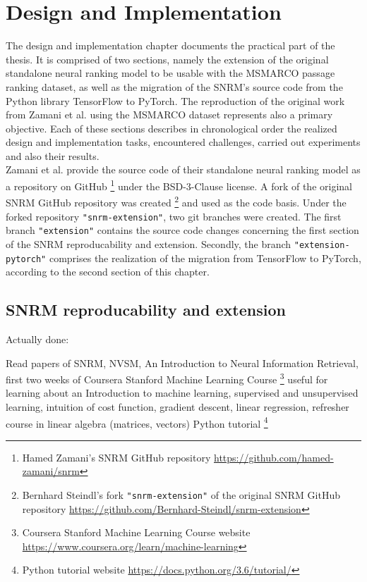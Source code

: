 \chapter{Design and Implementation}

The design and implementation chapter documents the practical part of the thesis.
It is comprised of two sections, namely the extension of the original standalone neural
    ranking model to be usable with the MSMARCO passage ranking dataset,
    as well as the migration of the SNRM's source code from the Python library TensorFlow 
    to PyTorch.
The reproduction of the original work from 
    Zamani et al. \cite{zamani:2018:from-neural-reranking-to-neural-ranking}
    using the MSMARCO dataset represents also a primary objective.
Each of these sections describes in chronological order the realized
    design and implementation tasks, encountered challenges, 
    carried out experiments and also their results.\\
Zamani et al. provide the source code of their standalone neural ranking model as a
    repository on GitHub
    \footnote{Hamed Zamani's SNRM GitHub repository \url{https://github.com/hamed-zamani/snrm}}
    under the BSD-3-Clause license.
A fork of the original SNRM GitHub repository was created
    \footnote{Bernhard Steindl's fork \texttt{"snrm-extension"} of the original SNRM GitHub repository  \url{https://github.com/Bernhard-Steindl/snrm-extension}}
    and used as the code basis.
Under the forked repository \texttt{"snrm-extension"}, two git branches were created.
The first branch \texttt{"extension"} contains the source code changes concerning the first
    section of the SNRM reproducability and extension.
Secondly, the branch \texttt{"extension-pytorch"} comprises the realization of the migration
    from TensorFlow to PyTorch, according to the second section of this chapter.


\section{SNRM reproducability and extension}
Actually done:

Read papers of SNRM, NVSM, An Introduction to Neural Information Retrieval,
first two weeks of Coursera Stanford Machine Learning Course \footnote{Coursera Stanford Machine Learning Course website \url{https://www.coursera.org/learn/machine-learning}}
useful for learning about an Introduction to machine learning, supervised and unsupervised learning, intuition of
cost function, gradient descent, linear regression, refresher course in linear algebra (matrices, vectors)
Python tutorial \footnote{Python tutorial website \url{https://docs.python.org/3.6/tutorial/}}

